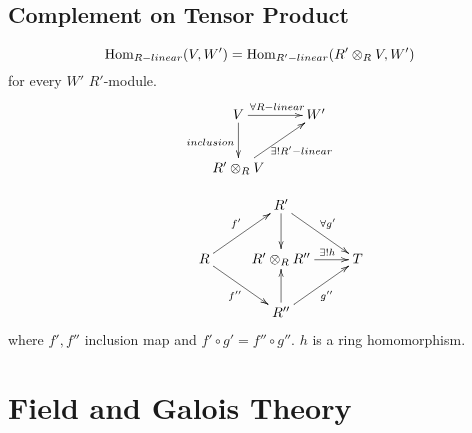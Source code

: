 \subsection{Complement on Tensor Product}
\begin{proposition}
    \[\operatorname{Hom}_{R-linear}(V,W')=\operatorname{Hom}_{R'-linear}(R'\otimes_R V,W')\]
    for every  $W' $ $ R' $-module. 
    \[
    \xymatrix{
         V 
            \ar[r]
                ^{ \forall  R  -linear}
            \ar[d]_{inclusion}
        &W' 
        \\R'\otimes_R V
            \ar[ur]_{ \exists !  R' -linear  }
    }
    \]
\end{proposition}
\begin{proposition}
    \[
        \xymatrix{
            &{}&R'\ar[dr]^{\forall g'}\ar[d]\\
            &R\ar[ur]^{f'}\ar[dr]_{f''}
            &R'\otimes_R R''\ar[r]^{\,\quad\exists ! h}
            &T\\
            &{}&R''\ar[u]\ar[ur]_{g''}
        }
    \]
    where  $ f',f'' $  inclusion map and  $ f'\circ g'=f''\circ g'' $.  $ h  $ is a ring homomorphism. 
\end{proposition}
\section{Field and Galois Theory}
